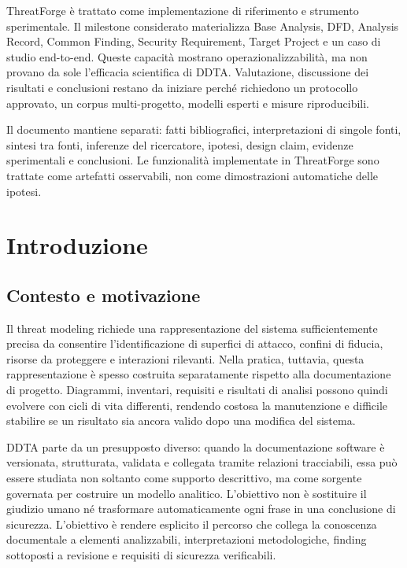 \documentclass[12pt,a4paper,oneside]{report}
\begin{document}
ThreatForge è trattato come implementazione di riferimento e strumento sperimentale. Il milestone considerato materializza Base Analysis, DFD, Analysis Record, Common Finding, Security Requirement, Target Project e un caso di studio end-to-end. Queste capacità mostrano operazionalizzabilità, ma non provano da sole l'efficacia scientifica di DDTA. Valutazione, discussione dei risultati e conclusioni restano da iniziare perché richiedono un protocollo approvato, un corpus multi-progetto, modelli esperti e misure riproducibili.

\begin{epistemicnote}
Il documento mantiene separati: fatti bibliografici, interpretazioni di singole fonti, sintesi tra fonti, inferenze del ricercatore, ipotesi, design claim, evidenze sperimentali e conclusioni. Le funzionalità implementate in ThreatForge sono trattate come artefatti osservabili, non come dimostrazioni automatiche delle ipotesi.
\end{epistemicnote}

\tableofcontents
\clearpage
{}

\chapter{Introduzione}

\section{Contesto e motivazione}

Il threat modeling richiede una rappresentazione del sistema sufficientemente precisa da consentire l'identificazione di superfici di attacco, confini di fiducia, risorse da proteggere e interazioni rilevanti. Nella pratica, tuttavia, questa rappresentazione è spesso costruita separatamente rispetto alla documentazione di progetto. Diagrammi, inventari, requisiti e risultati di analisi possono quindi evolvere con cicli di vita differenti, rendendo costosa la manutenzione e difficile stabilire se un risultato sia ancora valido dopo una modifica del sistema.

DDTA parte da un presupposto diverso: quando la documentazione software è versionata, strutturata, validata e collegata tramite relazioni tracciabili, essa può essere studiata non soltanto come supporto descrittivo, ma come sorgente governata per costruire un modello analitico. L'obiettivo non è sostituire il giudizio umano né trasformare automaticamente ogni frase in una conclusione di sicurezza. L'obiettivo è rendere esplicito il percorso che collega la conoscenza documentale a elementi analizzabili, interpretazioni metodologiche, finding sottoposti a revisione e requisiti di sicurezza verificabili.
\end{document}
